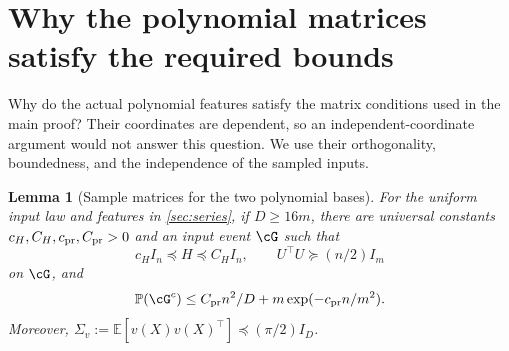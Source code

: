 \documentclass[11pt,twoside]{article}
\newcommand{\E}{\mathbb E}
\renewcommand{\P}{\mathbb P}
\newtheorem{lemma}[theorem]{Lemma}
\theoremstyle{definition}
\theoremstyle{remark}
\begin{document}
\section{Why the polynomial matrices satisfy the required bounds}
\label{app:legendre-proof}

Why do the actual polynomial features satisfy the matrix conditions used in
the main proof? Their coordinates are dependent, so an independent-coordinate
argument would not answer this question. We use their orthogonality,
boundedness, and the independence of the sampled inputs.

\begin{lemma}[Sample matrices for the two polynomial bases]
\label{lem:polynomial-event}
For the uniform input law and features in \cref{sec:series}, if $D\ge16m$,
there are universal constants $c_H,C_H,c_{\rm pr},C_{\rm pr}>0$ and an
input event $\cG$ such that
\[
 c_HI_n\preceq H\preceq C_HI_n,
 \qquad U^\top U\succeq(n/2)I_m
\]
on $\cG$, and
\[
 \P(\cG^c)\le C_{\rm pr}n^2/D
       +m\exp(-c_{\rm pr}n/m^2).
\]
Moreover, $\Sigma_v:=\E[v(X)v(X)^\top]\preceq(\pi/2)I_D$.
\end{lemma}
\end{document}
